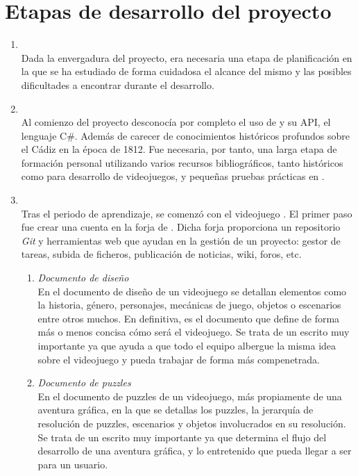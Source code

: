 \section{Etapas de desarrollo del proyecto}

\begin{enumerate}
\item{} \hfill \\
Dada la envergadura del proyecto, era necesaria una etapa de planificación en la que se ha estudiado de forma cuidadosa el alcance del mismo y las posibles dificultades a encontrar durante el desarrollo.

\item{} \hfill \\
Al comienzo del proyecto desconocía por completo el uso de  y su API, el lenguaje C\#. Además de carecer de conocimientos históricos profundos sobre el Cádiz en la época de 1812. Fue necesaria, por tanto, una larga etapa de formación personal utilizando varios recursos bibliográficos, tanto históricos como para desarrollo de videojuegos, y pequeñas pruebas prácticas en .

\item{} \hfill \\
Tras el periodo de aprendizaje, se comenzó con el videojuego \nombrejuego{}. El primer paso fue crear una cuenta en la forja de . Dicha forja proporciona un repositorio \emph{Git} y herramientas web que ayudan en la gestión de un proyecto: gestor de tareas, subida de ficheros, publicación de noticias, wiki, foros, etc.

\begin{enumerate}
\item \emph{Documento de diseño} \hfill \\
En el documento de diseño de un videojuego se detallan elementos como la historia, género, personajes, mecánicas de juego, objetos o escenarios entre otros muchos. En definitiva, es el documento que define de forma más o menos concisa cómo será el videojuego. Se trata de un escrito muy importante ya que ayuda a que todo el equipo albergue la misma idea sobre el videojuego y pueda trabajar de forma más compenetrada.

\item \emph{Documento de puzzles} \hfill \\
En el documento de puzzles de un videojuego, más propiamente de una aventura gráfica, en la que se detallas los puzzles, la jerarquía de resolución de puzzles, escenarios y objetos involucrados en su resolución. Se trata de un escrito muy importante ya que determina el flujo del desarrollo de una aventura gráfica, y lo entretenido que pueda llegar a ser para un usuario.


\end{enumerate}
\end{enumerate}
